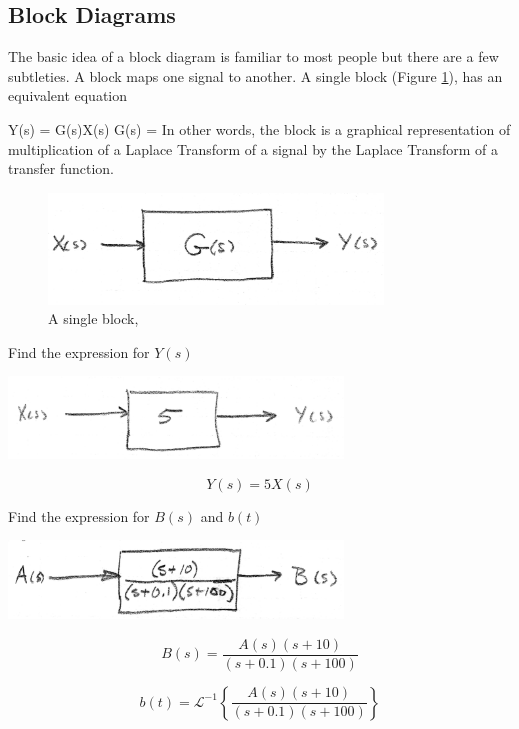 \subsection{Block Diagrams}
The basic idea of a block diagram is familiar to most people but there are a few subtleties.  A block maps one signal to another.  A single block (Figure \ref{singleblock}), has an equivalent equation

\bq\label{blockequation}
Y(s) = G(s)X(s) \qquad {} \qquad G(s) = 
\eq
In other words, the block is a graphical representation of multiplication of a Laplace Transform of a signal by the Laplace Transform of a transfer function.


\begin{figure}\centering
\includegraphics[width=3.5in]{figs06/00764a.png}
\caption{A single block,}\label{singleblock}
\end{figure}


\begin{ExampleSmall}
Find the expression for $Y(s)$

\includegraphics[width=3.5in]{figs06/00765a.png}

\[
Y(s) = 5 X(s)
\]

\end{ExampleSmall}


\begin{ExampleSmall}
Find the expression for $B(s)$ and $b(t)$

\includegraphics[width=3.5in]{figs06/00766a.png}

\[
B(s) = \frac{A(s)(s+10)}{(s+0.1)(s+100)}
\]

\[
b(t) = \mathcal L^{-1} \left \{ \frac{A(s)(s+10)}{(s+0.1)(s+100)}  \right \}
\]
\end{ExampleSmall}

